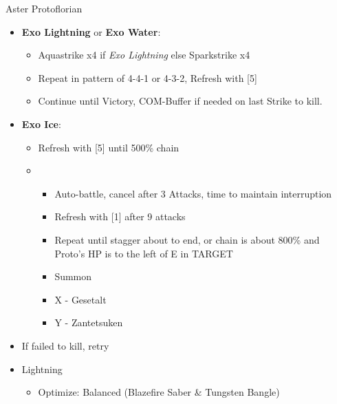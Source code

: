 \begin{battle}{Aster Protoflorian}
\begin{multicols}{2}
\begin{itemize}
\begin{itemize}
        \item \stagger
     \end{itemize}
      \item \textbf{Exo Lightning} or \textbf{Exo Water}:
        \begin{itemize}
            \item Aquastrike x4 if \textit{Exo Lightning} else Sparkstrike x4
            \item Repeat in pattern of 4-4-1 or 4-3-2, Refresh with [5]
            \item Continue until Victory, COM-Buffer if needed on last Strike to kill.
        \end{itemize}
        \item \textbf{Exo Ice}:
        \begin{itemize}
            \item Refresh with [5] until 500\% chain
            \item \sixth
            \begin{itemize}
                \item Auto-battle, cancel after 3 Attacks, time to maintain interruption
                \item Refresh with [1] after 9 attacks
                \item Repeat until stagger about to end, or chain is about 800\% and Proto's HP is to the left of E in TARGET
                \item Summon
                \item X - Gesetalt
                \item Y - Zantetsuken
            \end{itemize}
    \end{itemize}
    \item If failed to kill, retry
\end{itemize}
\end{multicols}
\end{battle}
\begin{multicols}{2}
\begin{menu}
    \begin{itemize}
        \equip
        \begin{itemize}
            \item Lightning
            \begin{itemize}
            		\item Optimize: Balanced (Blazefire Saber \& Tungsten Bangle)
            \end{itemize}
        \end{itemize}
    \end{itemize}
\end{menu}

\vfill
\end{multicols}
